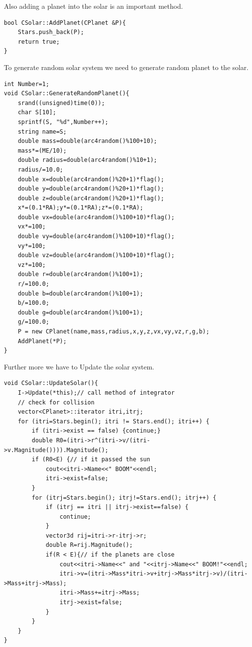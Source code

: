 \documentclass[12pt]{article}
\begin{document}
Also adding a planet into the solar is an important method.
\begin{lstlisting}[caption=AddPlanet()]
bool CSolar::AddPlanet(CPlanet &P){
    Stars.push_back(P);
    return true;
}
\end{lstlisting}
\clearpage
To generate random solar system we need to generate random planet to the solar.
\begin{lstlisting}[caption=GenerateRandomPlanet()]
int Number=1;
void CSolar::GenerateRandomPlanet(){
    srand((unsigned)time(0));
    char S[10];
    sprintf(S, "%d",Number++);
    string name=S;
    double mass=double(arc4random()%100+10);
    mass*=(ME/10); 
    double radius=double(arc4random()%10+1);
    radius/=10.0;
    double x=double(arc4random()%20+1)*flag();
    double y=double(arc4random()%20+1)*flag();
    double z=double(arc4random()%20+1)*flag();
    x*=(0.1*RA);y*=(0.1*RA);z*=(0.1*RA);
    double vx=double(arc4random()%100+10)*flag();
    vx*=100;
    double vy=double(arc4random()%100+10)*flag();
    vy*=100;
    double vz=double(arc4random()%100+10)*flag();
    vz*=100;
    double r=double(arc4random()%100+1);
    r/=100.0;
    double b=double(arc4random()%100+1);
    b/=100.0;
    double g=double(arc4random()%100+1);
    g/=100.0;
    P = new CPlanet(name,mass,radius,x,y,z,vx,vy,vz,r,g,b);
    AddPlanet(*P);
}
\end{lstlisting}

\clearpage
Further more we have to Update the solar system.
\begin{lstlisting}[caption=UpdateSolar()]
void CSolar::UpdateSolar(){
    I->Update(*this);// call method of integrator
    // check for collision
    vector<CPlanet>::iterator itri,itrj;
    for (itri=Stars.begin(); itri != Stars.end(); itri++) {
        if (itri->exist == false) {continue;}
        double R0=(itri->r^(itri->v/(itri->v.Magnitude()))).Magnitude();
        if (R0<E) {// if it passed the sun
            cout<<itri->Name<<" BOOM"<<endl;
            itri->exist=false;
        }
        for (itrj=Stars.begin(); itrj!=Stars.end(); itrj++) {
            if (itrj == itri || itrj->exist==false) {
                continue;
            }
            vector3d rij=itri->r-itrj->r;
            double R=rij.Magnitude();
            if(R < E){// if the planets are close
                cout<<itri->Name<<" and "<<itrj->Name<<" BOOM!"<<endl;
                itri->v=(itri->Mass*itri->v+itrj->Mass*itrj->v)/(itri->Mass+itrj->Mass);
                itri->Mass+=itrj->Mass;
                itrj->exist=false;       
            }
        }
    }
}
\end{lstlisting}
\end{document}

